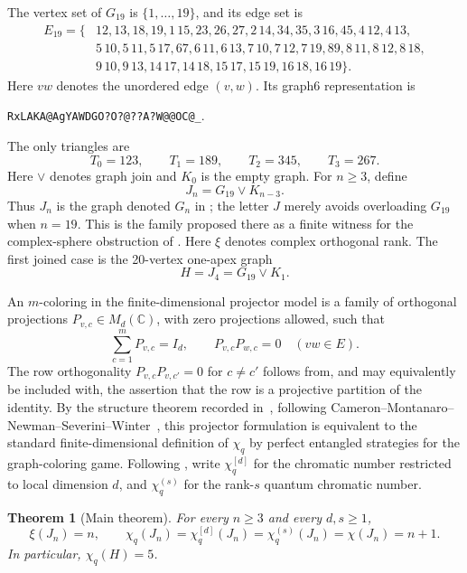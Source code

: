 \documentclass[11pt]{article}
\newtheorem{theorem}{Theorem}[section]
\newcommand{\C}{\mathbb C}
\newcommand{\id}{I}
\newcommand{\join}{\mathbin{\vee}}
\begin{document}
The vertex set of $G_{19}$ is $\{1,\ldots,19\}$, and its edge set is
\begin{align*}
E_{19}=\{&12,13,18,19,1\,15,
23,26,27,2\,14,34,35,3\,16,45,4\,12,4\,13,\\
&5\,10,5\,11,5\,17,67,6\,11,6\,13,
7\,10,7\,12,7\,19,89,8\,11,8\,12,8\,18,\\
&9\,10,9\,13,14\,17,14\,18,15\,17,15\,19,16\,18,16\,19\}.
\end{align*}
Here $vw$ denotes the unordered edge $(v,w)$.  Its graph6 representation is
\begin{center}
\texttt{RxLAKA@AgYAWDGO?O?@??A?W@@OC@\_}.
\end{center}
The only triangles are
\[
 T_0=123,\qquad T_1=189,\qquad T_2=345,\qquad T_3=267.
\]
Here $\join$ denotes graph join and $K_0$ is the empty graph.  For $n\geq3$,
define
\[
   J_n=G_{19}\join K_{n-3}.
\]
Thus $J_n$ is the graph denoted $G_n$ in
\cite[Section~4.2]{Lalonde2026}; the letter $J$ merely avoids overloading
$G_{19}$ when $n=19$.  This is the family proposed there as a finite witness
for the complex-sphere obstruction of \cite[Theorem~1.2]{Lalonde2026}.
Here $\xi$ denotes complex orthogonal rank.  The first joined case is the
20-vertex one-apex graph
\[
   H=J_4=G_{19}\join K_1.
\]

An $m$-coloring in the finite-dimensional projector model is a family of
orthogonal projections $P_{v,c}\in M_d(\C)$, with zero projections allowed,
such that
\[
 \sum_{c=1}^mP_{v,c}=\id_d,
 \qquad
 P_{v,c}P_{w,c}=0\quad(vw\in E).
\]
The row orthogonality $P_{v,c}P_{v,c'}=0$ for $c\ne c'$ follows from, and may
equivalently be included with, the assertion that the row is a projective
partition of the identity.
By the structure theorem recorded in~\cite[Theorem~2.19]{Lalonde2026},
following Cameron--Montanaro--Newman--Severini--Winter~\cite{CameronEtAl2007},
this projector formulation is equivalent to the standard finite-dimensional
definition of $\chi_q$ by perfect entangled strategies for the graph-coloring
game.
Following \cite[Section~2.4.2]{Lalonde2026}, write $\chi_q^{[d]}$ for the
chromatic number restricted to local dimension $d$, and $\chi_q^{(s)}$ for
the rank-$s$ quantum chromatic number.

\begin{theorem}[Main theorem]\label{thm:main}
For every $n\geq3$ and every $d,s\geq1$,
\[
 \xi(J_n)=n,\qquad
 \chi_q(J_n)=\chi_q^{[d]}(J_n)=\chi_q^{(s)}(J_n)=\chi(J_n)=n+1.
\]
In particular, $\chi_q(H)=5$.
\end{theorem}
\end{document}
